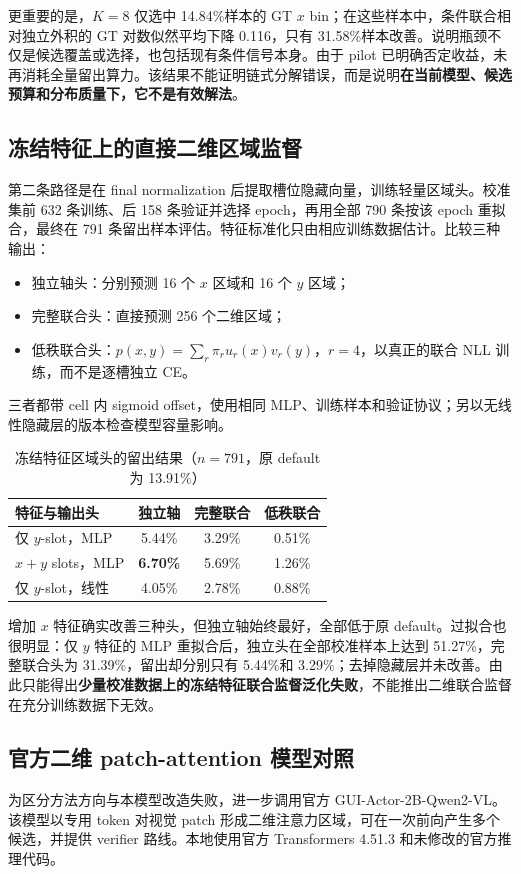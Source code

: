 \documentclass[UTF8,a4paper,11pt,fontset=none]{ctexart}
\begin{document}
更重要的是，$K=8$ 仅选中 14.84\%样本的 GT $x$ bin；在这些样本中，条件联合相对独立外积的 GT 对数似然平均下降 0.116，只有 31.58\%样本改善。说明瓶颈不仅是候选覆盖或选择，也包括现有条件信号本身。由于 pilot 已明确否定收益，未再消耗全量留出算力。该结果不能证明链式分解错误，而是说明\textbf{在当前模型、候选预算和分布质量下，它不是有效解法}。

\subsection{冻结特征上的直接二维区域监督}
第二条路径是在 final normalization 后提取槽位隐藏向量，训练轻量区域头。校准集前 632 条训练、后 158 条验证并选择 epoch，再用全部 790 条按该 epoch 重拟合，最终在 791 条留出样本评估。特征标准化只由相应训练数据估计。比较三种输出：
\begin{itemize}
  \item 独立轴头：分别预测 16 个 $x$ 区域和 16 个 $y$ 区域；
  \item 完整联合头：直接预测 256 个二维区域；
  \item 低秩联合头：$p(x,y)=\sum_r\pi_r u_r(x)v_r(y)$，$r=4$，以真正的联合 NLL 训练，而不是逐槽独立 CE。
\end{itemize}
三者都带 cell 内 sigmoid offset，使用相同 MLP、训练样本和验证协议；另以无线性隐藏层的版本检查模型容量影响。
\begin{table}[H]
\centering\small
\caption{冻结特征区域头的留出结果（$n=791$，原 default 为 13.91\%）}
\begin{tabular}{lccc}
\toprule
特征与输出头 & 独立轴 & 完整联合 & 低秩联合 \\
\midrule
仅 $y$-slot，MLP & 5.44\% & 3.29\% & 0.51\% \\
$x+y$ slots，MLP & \textbf{6.70\%} & 5.69\% & 1.26\% \\
仅 $y$-slot，线性 & 4.05\% & 2.78\% & 0.88\% \\
\bottomrule
\end{tabular}
\end{table}

增加 $x$ 特征确实改善三种头，但独立轴始终最好，全部低于原 default。过拟合也很明显：仅 $y$ 特征的 MLP 重拟合后，独立头在全部校准样本上达到 51.27\%，完整联合头为 31.39\%，留出却分别只有 5.44\%和 3.29\%；去掉隐藏层并未改善。由此只能得出\textbf{少量校准数据上的冻结特征联合监督泛化失败}，不能推出二维联合监督在充分训练数据下无效。

\subsection{官方二维 patch-attention 模型对照}
为区分方法方向与本模型改造失败，进一步调用官方 GUI-Actor-2B-Qwen2-VL。该模型以专用 token 对视觉 patch 形成二维注意力区域，可在一次前向产生多个候选，并提供 verifier 路线\cite{guiactor}。本地使用官方 Transformers 4.51.3 和未修改的官方推理代码。
\end{document}
